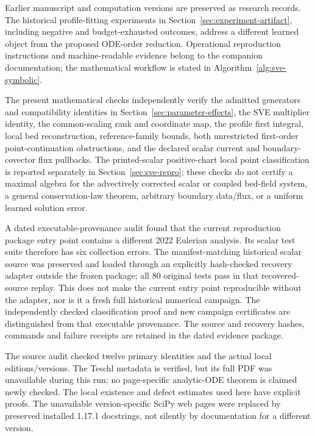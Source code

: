 \documentclass[11pt]{article}
\theoremstyle{definition}
\begin{document}
Earlier manuscript and computation versions are preserved as research
records. The historical profile-fitting experiments in
Section~\ref{sec:experiment-artifact}, including negative and
budget-exhausted outcomes, address a different learned object from the
proposed ODE-order reduction. Operational reproduction instructions and
machine-readable evidence belong to the companion documentation; the
mathematical workflow is stated in Algorithm~\ref{alg:sve-symbolic}.

The present mathematical checks independently verify the admitted generators
and compatibility identities in Section~\ref{sec:parameter-effects}, the SVE multiplier identity,
the common-scaling rank and coordinate map, the profile first integral, local
bed reconstruction, reference-family bounds, both unrestricted first-order
point-continuation obstructions, and the declared scalar current and
boundary-covector flux pullbacks. The printed-scalar positive-chart local
point classification is reported separately in Section~\ref{sec:sve-repro};
these checks do not certify a maximal algebra for the advectively corrected
scalar or coupled bed-field system, a general conservation-law theorem,
arbitrary boundary data/flux, or a uniform learned solution error.

A dated executable-provenance audit found that the current reproduction
package entry point contains a different 2022 Eulerian analysis. Its scalar
test suite therefore has six collection errors. The manifest-matching
historical scalar source was preserved and loaded through an explicitly
hash-checked recovery adapter outside the frozen package; all 80 original
tests pass in that recovered-source replay. This does not make the current
entry point reproducible without the adapter, nor is it a fresh full
historical numerical campaign. The independently checked classification
proof and new campaign certificates are distinguished from that executable
provenance. The source and recovery hashes, commands and failure receipts
are retained in the dated evidence package.

The source audit checked twelve primary identities and the actual local
editions/versions. The Teschl metadata is verified, but its full PDF was
unavailable during this run; no page-specific analytic-ODE theorem is
claimed newly checked. The local existence and defect estimates used here
have explicit proofs. The unavailable version-specific SciPy web pages
were replaced by preserved installed 1.17.1 docstrings, not silently by
documentation for a different version.
\end{document}
